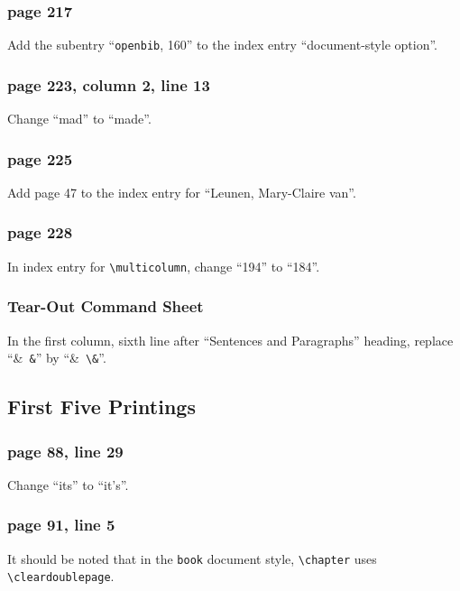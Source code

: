 \subsubsection*{page 217}
Add the subentry ``{\tt openbib}, 160'' to the index entry
``document-style option''.


\subsubsection*{page 223, column 2, line 13}
Change ``mad'' to ``made''.

\subsubsection*{page 225}
Add page 47 to the index entry for ``Leunen, Mary-Claire van''.

\subsubsection*{page 228}
In index entry for \verb|\multicolumn|, change ``194''
to ``184''.


\subsubsection*{Tear-Out Command Sheet}

In the first column, sixth line after ``Sentences and Paragraphs'' heading, 
replace ``\hbox{\& \verb|&|}'' by ``\hbox{\& \verb|\&|}''.

\subsection{First Five Printings}

\subsubsection*{page 88, line 29}
Change ``its'' to ``it's''.

\subsubsection*{page 91, line 5}
\begin{sloppypar}
It should be noted that in the {\tt book} document style,
\verb|\chapter| uses \verb|\cleardoublepage|.
\end{sloppypar}

